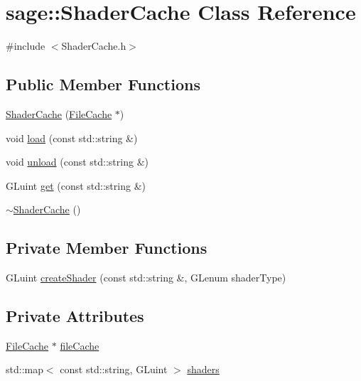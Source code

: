 \hypertarget{classsage_1_1ShaderCache}{}\section{sage\+::Shader\+Cache Class Reference}
\label{classsage_1_1ShaderCache}


{\ttfamily \#include $<$Shader\+Cache.\+h$>$}

\subsection*{Public Member Functions}
\begin{DoxyCompactItemize}
\item 
\mbox{\hyperlink{classsage_1_1ShaderCache_a9977d4b3bae3c36778d0a6f0fd73bc2e}{Shader\+Cache}} (\mbox{\hyperlink{classsage_1_1FileCache}{File\+Cache}} $\ast$)
\item 
void \mbox{\hyperlink{classsage_1_1ShaderCache_a3354d3c69b77ef0f1221ef8a0571826b}{load}} (const std\+::string \&)
\item 
void \mbox{\hyperlink{classsage_1_1ShaderCache_ab305b4c76870619524a6236899327ad6}{unload}} (const std\+::string \&)
\item 
G\+Luint \mbox{\hyperlink{classsage_1_1ShaderCache_aafc93b46c5a0416653424ee0b60b8aae}{get}} (const std\+::string \&)
\item 
\mbox{\hyperlink{classsage_1_1ShaderCache_a060caa88a1718dddc0800aa552ac4a41}{$\sim$\+Shader\+Cache}} ()
\end{DoxyCompactItemize}
\subsection*{Private Member Functions}
\begin{DoxyCompactItemize}
\item 
G\+Luint \mbox{\hyperlink{classsage_1_1ShaderCache_a6faed61c708a429ddb246855707c8596}{create\+Shader}} (const std\+::string \&, G\+Lenum shader\+Type)
\end{DoxyCompactItemize}
\subsection*{Private Attributes}
\begin{DoxyCompactItemize}
\item 
\mbox{\hyperlink{classsage_1_1FileCache}{File\+Cache}} $\ast$ \mbox{\hyperlink{classsage_1_1ShaderCache_af867dfc6c9921610804c856cd844f648}{file\+Cache}}
\item 
std\+::map$<$ const std\+::string, G\+Luint $>$ \mbox{\hyperlink{classsage_1_1ShaderCache_a194bb7e1c8d2304d251cdeb52d8530df}{shaders}}
\end{DoxyCompactItemize}


